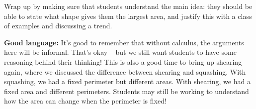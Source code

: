 \documentclass[noauthor,nooutcomes]{ximera}
\begin{document}
\begin{instructorNotes}
Wrap up by making sure that students understand the main idea: they should be able to state what shape gives them the largest area, and justify this with a class of examples and discussing a trend.


{\bf Good language:} It's good to remember that without calculus, the arguments here will be informal. That's okay -- but we still want students to have some reasoning behind their thinking! This is also a good time to bring up shearing again, where we discussed the difference between shearing and squashing. With squashing, we had a fixed perimeter but different areas. With shearing, we had a fixed area and different perimeters. Students may still be working to understand how the area can change when the perimeter is fixed!



\end{instructorNotes}
\end{document}
